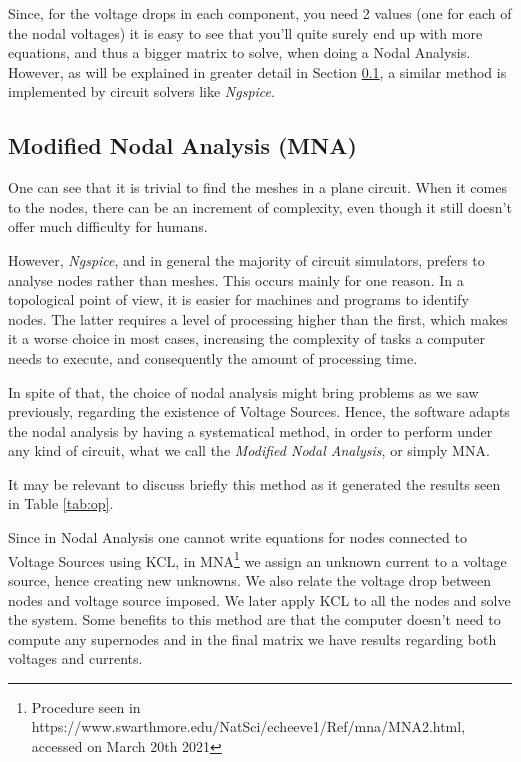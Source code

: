 Since, for the voltage drops in each component, you need 2 values (one for each of the nodal voltages) it is easy to see that you'll quite surely end up with more equations, and thus a bigger matrix to solve, when doing a Nodal Analysis. However, as will be explained in greater detail in Section \ref{subsec_mna}, a similar method is implemented by circuit solvers like \textit{Ngspice}.

\subsection{Modified Nodal Analysis (MNA)}
\label{subsec_mna}

One can see that it is trivial to find the meshes in a plane circuit. When it comes to the nodes, there can be an increment of complexity, even though it still doesn't offer much difficulty for humans.

However, \textit{Ngspice}, and in general the majority of circuit simulators, prefers to analyse nodes rather than meshes. This occurs mainly for one reason. In a topological point of view, it is easier for machines and programs to identify nodes. The latter requires a level of processing higher than the first, which makes it a worse choice in most cases, increasing the complexity of tasks a computer needs to execute, and consequently the amount of processing time.

In spite of that, the choice of nodal analysis might bring problems as we saw previously, regarding the existence of Voltage Sources. Hence, the software adapts the nodal analysis by having a systematical method, in order to perform under any kind of circuit, what we call the \textit{Modified Nodal Analysis}, or simply MNA.
 
It may be relevant to discuss briefly this method as it generated the results seen in Table \ref{tab:op}. \par
Since in Nodal Analysis one cannot write equations for nodes connected to Voltage Sources using KCL, in MNA\footnote{Procedure seen in https://www.swarthmore.edu/NatSci/echeeve1/Ref/mna/MNA2.html, accessed on March 20th 2021} we assign an unknown current to a voltage source, hence creating new unknowns. We also relate the voltage drop between nodes and voltage source imposed.  We later apply KCL to all the nodes and solve the system. Some benefits to this method are that the computer doesn't need to compute any supernodes and in the final matrix we have results regarding both voltages and currents.


